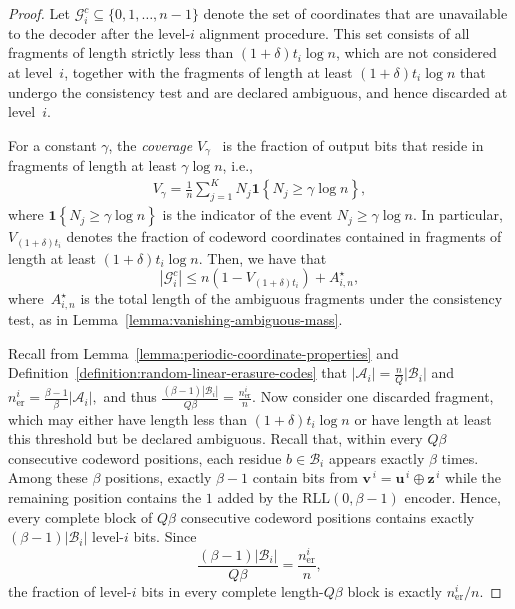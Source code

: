 \documentclass[journal,letterpaper,onecolumn,11pt]{IEEEtran}
\newcommand{\cA}{\mathcal{A}}
\newcommand{\cB}{\mathcal{B}}
\newcommand{\cG}{\mathcal{G}}
\newcommand{\boldu}{\mathbf{u}}
\newcommand{\boldv}{\mathbf{v}}
\newcommand{\boldz}{\mathbf{z}}
\begin{document}
\begin{proof}
Let $\cG_i^c \subseteq \{0,1,\ldots,n-1\}$ denote the set of coordinates that are unavailable to the decoder after the level-$i$ alignment procedure.
This set consists of all fragments of length strictly less than $(1+\delta)t_i\log n$, which are not considered at level~$i$, together with the fragments of length at least $(1+\delta)t_i\log n$ that undergo the consistency test and are declared ambiguous, and hence discarded at level~$i$. 

For a constant \(\gamma\), the \textit{coverage} \(V_\gamma\)~\cite[Def.~1]{shomorony2021torn} is the fraction of output bits that reside in fragments of length at least \(\gamma\log n\), i.e.,
\begin{align}\label{Definition: coverage of fragment}
    V_\gamma=\frac{1}{n}\sum_{j=1}^{K}N_j\mathbf{1}\!\left\{N_j\geq\gamma\log n\right\},
\end{align}
where \(\mathbf{1}\!\left\{N_j\geq\gamma\log n\right\}\) is the indicator of the event \(N_j\geq\gamma\log n\). 
In particular, \(V_{(1+\delta)t_i}\) denotes the fraction of codeword coordinates contained in fragments of length at least \((1+\delta)t_i\log n\). 
Then, we have that
$$
|\cG_i^c| \leq n(1 - V_{(1+\delta)t_i}) + A_{i,n}^{\star},
$$
where~\(A_{i,n}^{\star}\) is the total length of the ambiguous fragments under the consistency test, as in Lemma~\ref{lemma:vanishing-ambiguous-mass}.

Recall from Lemma~\ref{lemma:periodic-coordinate-properties} and Definition~\ref{definition:random-linear-erasure-codes} that $|\cA_i|=\frac{n}{Q}|\cB_i|$ and $n_{\mathrm{er}}^i=\frac{\beta-1}{\beta}|\cA_i|,$ and thus $\frac{(\beta-1)|\cB_i|}{Q\beta}=\frac{n_{\mathrm{er}}^i}{n}.$
Now consider one discarded fragment, which may either have length less than
\((1+\delta)t_i\log n\) or have length at least this threshold but be
declared ambiguous.  
Recall that, within every \(Q\beta\) consecutive
codeword positions, each residue \(b\in\cB_i\) appears exactly \(\beta\)
times.  
Among these \(\beta\) positions,
exactly \(\beta-1\) contain bits from
\(\boldv^{\,i}=\boldu^{\,i}\oplus\boldz^{\,i}\) while the remaining
position contains the \(1\) added by the
\(\mathrm{RLL}(0,\beta-1)\) encoder.  
Hence, every complete block of
\(Q\beta\) consecutive codeword positions contains exactly
\((\beta-1)|\cB_i|\) level-\(i\) bits.  Since
\[
\frac{(\beta-1)|\cB_i|}{Q\beta}
=
\frac{n_{\mathrm{er}}^i}{n},
\]
the fraction of level-\(i\) bits in every complete length-\(Q\beta\)
block is exactly \(n_{\mathrm{er}}^i/n\).


\end{proof}
\end{document}
